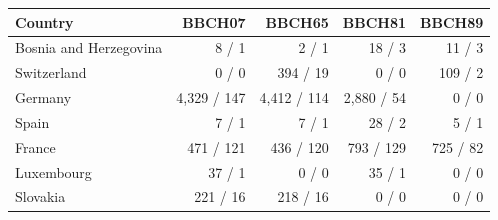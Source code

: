 \begin{tabular}{lrrrr}
\toprule
Country & BBCH07 & BBCH65 & BBCH81 & BBCH89 \\
\midrule
Bosnia and Herzegovina & 8 / 1 & 2 / 1 & 18 / 3 & 11 / 3 \\
Switzerland & 0 / 0 & 394 / 19 & 0 / 0 & 109 / 2 \\
Germany & 4,329 / 147 & 4,412 / 114 & 2,880 / 54 & 0 / 0 \\
Spain & 7 / 1 & 7 / 1 & 28 / 2 & 5 / 1 \\
France & 471 / 121 & 436 / 120 & 793 / 129 & 725 / 82 \\
Luxembourg & 37 / 1 & 0 / 0 & 35 / 1 & 0 / 0 \\
Slovakia & 221 / 16 & 218 / 16 & 0 / 0 & 0 / 0 \\
\bottomrule
\end{tabular}
